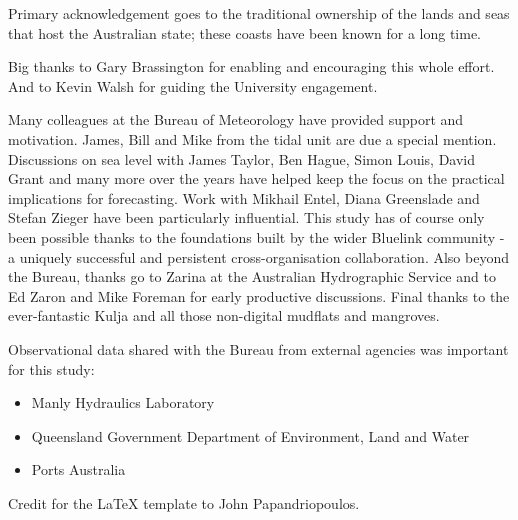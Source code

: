 
\begin{acknowledgements}

{\parindent0pt

Primary acknowledgement goes to the traditional ownership of the lands and seas that host the Australian state; these coasts have been known for a long time.
\newline{}
    
Big thanks to Gary Brassington for enabling and encouraging this whole effort.
And to Kevin Walsh for guiding the University engagement. 


Many colleagues at the Bureau of Meteorology have provided support and motivation. 
James, Bill and Mike from the tidal unit are due a special mention.    
Discussions on sea level with James Taylor, Ben Hague, Simon Louis, David Grant and many more over the years have helped keep the focus on the practical implications for forecasting.
Work with Mikhail Entel, Diana Greenslade and Stefan Zieger have been particularly influential.
\newline{}
This study has of course only been possible thanks to the foundations built by the wider Bluelink community - a uniquely successful and persistent cross-organisation collaboration.
Also beyond the Bureau, thanks go to Zarina at the Australian Hydrographic Service and to Ed Zaron and Mike Foreman for early productive discussions. 
\newline{}
Final thanks to the ever-fantastic Kulja and all those non-digital mudflats and mangroves.  
\newline{}

Observational data shared with the Bureau from external agencies was important for this study:
\begin{itemize}
    \item Manly Hydraulics Laboratory %
    \item Queensland Government Department of Environment, Land and Water
    \item Ports Australia
\end{itemize}


Credit for the LaTeX template to John Papandriopoulos.  %

}   %
\end{acknowledgements}
